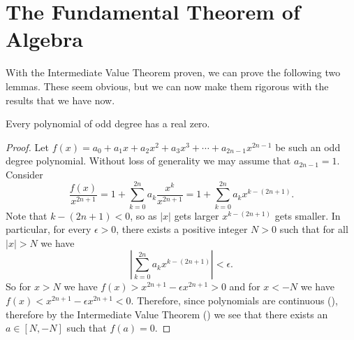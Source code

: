 \section{The Fundamental Theorem of Algebra}
With the Intermediate Value Theorem proven, we can prove the following two lemmas. These seem obvious, but we can now make them rigorous with the results that we have now.

\begin{lemma}\label{lemma-odd-degree-polynomial-has-real-zero}
    Every polynomial of odd degree has a real zero.
\end{lemma}
\begin{proof}
    Let $f(x) = a_0 + a_1x + a_2x^2 + a_3x^3 + \cdots + a_{2n-1}x^{2n-1}$ be such an odd degree polynomial. Without loss of generality we may assume that $a_{2n-1} = 1$. Consider
    \[
        \frac{f(x)}{x^{2n+1}} = 1 + \sum_{k=0}^{2n}a_k\frac{x^k}{x^{2n+1}} = 1 + \sum_{k=0}^{2n}a_kx^{k-(2n+1)}.
    \]
    Note that $k - (2n+1) < 0$, so as $|x|$ gets larger $x^{k-(2n+1)}$ gets smaller. In particular, for every $\epsilon > 0$, there exists a positive integer $N > 0$ such that for all $|x| > N$ we have
    \[
        \left|\sum_{k=0}^{2n}a_kx^{k-(2n+1)}\right| < \epsilon.
    \]
    So for $x > N$ we have $f(x) > x^{2n+1} - \epsilon x^{2n+1} > 0$ and for $x < -N$ we have $f(x) < x^{2n+1} - \epsilon x^{2n+1} < 0$. Therefore, since polynomials are continuous (), therefore by the Intermediate Value Theorem () we see that there exists an $a \in [N, -N]$ such that $f(a) = 0$.
\end{proof}

